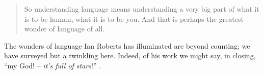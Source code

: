 \documentclass[output=paper]{langsci/langscibook}
\begin{document}
\begin{quote}
    So understanding language means understanding a very big part of what it is
    to be human, what it is to be you. And that is perhaps the greatest wonder
    of language of all.\hfill\citep[182]{Roberts2017}
\end{quote}

The wonders of language Ian Roberts has illuminated are beyond counting; we
have surveyed but a twinkling here. Indeed, of his work we might say, in
closing, “my God! -- \emph{it’s full of stars}!” \citep[202]{Clarke1968}.

\printchapterglossary{}

{\sloppy
\printbibliography[heading=subbibliography,notkeyword=this]
}
\end{document}
